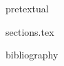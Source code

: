 \documentclass[11pt]{article}
\begin{document}
{pretextual}

{sections.tex}

{bibliography}
\end{document}
